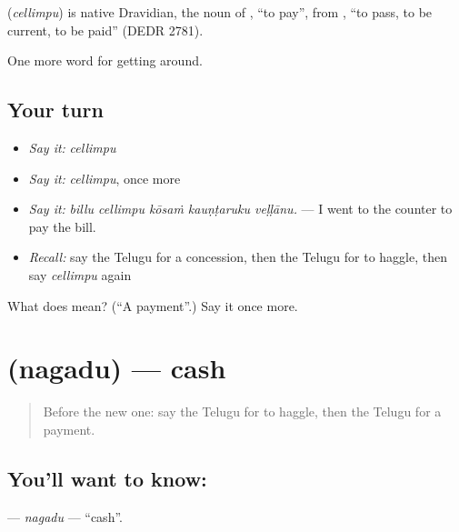 \begin{cousinweb}
\textbf{} (\emph{cellimpu}) is native Dravidian, the noun of , \textquotedblleft{}to pay\textquotedblright{}, from , \textquotedblleft{}to pass, to be current, to be paid\textquotedblright{} (DEDR 2781).
\end{cousinweb}

\begin{grammarlens}[title={What you've built}]
One more word for getting around.
\end{grammarlens}

\subsection*{Your turn}
\begin{itemize}
\raggedright
  \item \emph{Say it:} \emph{cellimpu}
  \item \emph{Say it:} \emph{cellimpu}, once more
  \item \emph{Say it:} \emph{billu cellimpu kōsaṁ kauṇṭaruku veḷḷānu.} — I went to the counter to pay the bill.
  \item \emph{Recall:} say the Telugu for a concession, then the Telugu for to haggle, then say \emph{cellimpu} again
\end{itemize}

\begin{tcolorbox}[breakable,colback=teal!4,colframe=teal!35!black,title={Before you move on}]
What does  mean? (\textquotedblleft{}A payment\textquotedblright{}.) Say it once more.
\end{tcolorbox}
\section[\texorpdfstring{\te{నగదు} (nagadu)}{నగదు (nagadu)}]{ (nagadu) — cash}

\label{lesson:TE-C485-nagadu}



\begin{quote}
Before the new one: say the Telugu for to haggle, then the Telugu for a payment.
\end{quote}

\subsection*{You'll want to know: }
\textbf{} — \emph{nagadu} — \textquotedblleft{}cash\textquotedblright{}.

